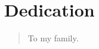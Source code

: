 \chapter*{Dedication}
\label{ch:list_of_appendices}
\begin{quote}
  To my family.
\end{quote}
\vfill
